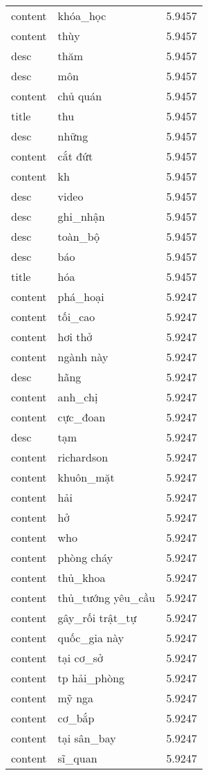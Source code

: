 \documentclass{article}
\begin{document}
\begin{tabular}{lll}
content & khóa\_học & 5.9457\\
content & thùy & 5.9457\\
desc & thăm & 5.9457\\
desc & môn & 5.9457\\
content & chủ quán & 5.9457\\
title & thu & 5.9457\\
desc & những & 5.9457\\
content & cắt đứt & 5.9457\\
content & kh & 5.9457\\
desc & video & 5.9457\\
desc & ghi\_nhận & 5.9457\\
desc & toàn\_bộ & 5.9457\\
desc & báo & 5.9457\\
title & hóa & 5.9457\\
content & phá\_hoại & 5.9247\\
content & tối\_cao & 5.9247\\
content & hơi thở & 5.9247\\
content & ngành này & 5.9247\\
desc & hãng & 5.9247\\
content & anh\_chị & 5.9247\\
content & cực\_đoan & 5.9247\\
desc & tạm & 5.9247\\
content & richardson & 5.9247\\
content & khuôn\_mặt & 5.9247\\
content & hải & 5.9247\\
content & hở & 5.9247\\
content & who & 5.9247\\
content & phòng cháy & 5.9247\\
content & thủ\_khoa & 5.9247\\
content & thủ\_tướng yêu\_cầu & 5.9247\\
content & gây\_rối trật\_tự & 5.9247\\
content & quốc\_gia này & 5.9247\\
content & tại cơ\_sở & 5.9247\\
content & tp hải\_phòng & 5.9247\\
content & mỹ nga & 5.9247\\
content & cơ\_bắp & 5.9247\\
content & tại sân\_bay & 5.9247\\
content & sĩ\_quan & 5.9247\\

\end{tabular}
\end{document}

